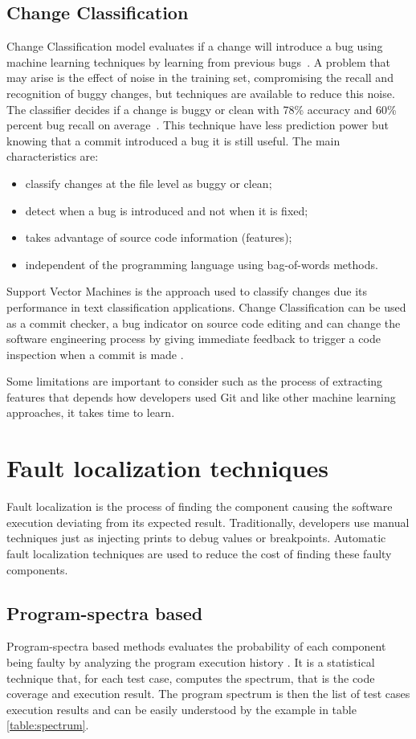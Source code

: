 \subsection{Change Classification}
Change Classification model evaluates if a change will introduce a bug using machine learning techniques by learning from previous bugs~\cite{Kim2008}. A problem that may arise is the effect of noise in the training set, compromising the recall and recognition of buggy changes, but techniques are available to reduce this noise. The classifier decides if a change is buggy or clean with 78\% accuracy and 60\% percent bug recall on average~\cite{Kim2008}. This technique have less prediction power but knowing that a commit introduced a bug it is still useful. The main characteristics are:
\begin{itemize}
  \item classify changes at the file level as buggy or clean;
  \item detect when a bug is introduced and not when it is fixed;
  \item takes advantage of source code information (features);
  \item independent of the programming language using bag-of-words methods.
\end{itemize}

Support Vector Machines is the approach used to classify changes due its performance in text classification applications. Change Classification can be used as a commit checker, a bug indicator on source code editing and can change the software engineering process by giving immediate feedback to trigger a code inspection when a commit is made \cite{Kim2008}. 

Some limitations are important to consider such as the process of extracting features that depends how developers used Git and like other machine learning approaches, it takes time to learn.

\section{Fault localization techniques}
Fault localization is the process of finding the component causing the software execution deviating from its expected result. Traditionally, developers use manual techniques just as injecting prints to debug values or breakpoints. Automatic fault localization techniques are used to reduce the cost of finding these faulty components.

\subsection{Program-spectra based}
Program-spectra based methods evaluates the probability of each component being faulty by analyzing the program execution history \cite{Perez2004}. It is a statistical technique that, for each test case, computes the spectrum, that is the code coverage and execution result. The program spectrum is then the list of test cases execution results and can be easily understood by the example in table \ref{table:spectrum}.

